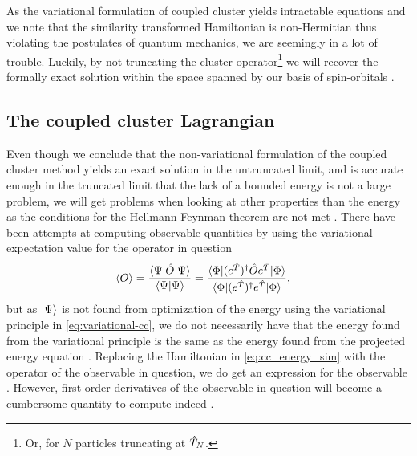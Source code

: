            As the variational formulation of coupled cluster yields intractable
            equations and we note that the similarity transformed Hamiltonian is
            non-Hermitian thus violating the postulates of quantum mechanics, we
            are seemingly in a lot of trouble.
            Luckily, by not truncating the cluster operator\footnote{%
                Or, for $N$ particles truncating at $\hat{T}_N$.
            } we will recover the formally exact solution within the space
            spanned by our basis of spin-orbitals \cite{coester1958421,
            monkhorst1977421}.

        \subsection{The coupled cluster Lagrangian}
            Even though we conclude that the non-variational formulation of
            the coupled cluster method yields an exact solution in the
            untruncated limit, and is accurate enough in the truncated limit
            that the lack of a bounded energy is not a large problem,
            we will get problems when looking at other properties than the
            energy as the conditions for the Hellmann-Feynman theorem are not
            met \cite{helgaker-molecular}.
            There have been attempts at computing observable quantities by using
            the variational expectation value for the operator in question
            \cite{exp-value-cizek, fink1974163}
            \begin{align}
                \left\langle O \right\rangle
                &= \frac{\langle \Psi |\hat{O}| \Psi \rangle}{\langle \Psi | \Psi \rangle}
                = \frac{
                    \langle \Phi | (e^{\hat{T}})^{\dagger}
                    \hat{O}
                    e^{\hat{T}}| \Phi \rangle}
                {\langle \Phi | (e^{\hat{T}})^{\dagger} e^{\hat{T}} | \Phi \rangle},
            \end{align}
            but as $| \Psi \rangle$ is not found from optimization of the energy
            using the variational principle in \autoref{eq:variational-cc}, we
            do not necessarily have that the energy found from the variational
            principle is the same as the energy found from the projected energy
            equation \cite{kvaal2013variational}.
            Replacing the Hamiltonian in \autoref{eq:cc_energy_sim} with the
            operator of the observable in question, we do get an expression for
            the observable \cite{kvaal2013variational}.
            However, first-order derivatives of the observable in question will
            become a cumbersome quantity to compute indeed
            \cite{helgaker-molecular}.

